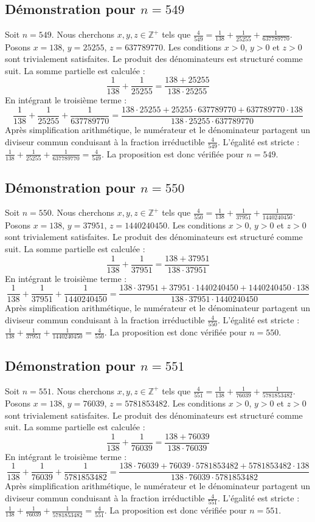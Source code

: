 \documentclass[11pt,a4paper]{article}
\begin{document}
\subsection{Démonstration pour $n = 549$}
Soit $n = 549$. Nous cherchons $x, y, z \in \mathbb{Z}^{+}$ tels que $\frac{4}{549} = \frac{1}{138} + \frac{1}{25255} + \frac{1}{637789770}$.
Posons $x = 138$, $y = 25255$, $z = 637789770$.
Les conditions $x > 0$, $y > 0$ et $z > 0$ sont trivialement satisfaites.
Le produit des dénominateurs est structuré comme suit. La somme partielle est calculée :
$$ \frac{1}{138} + \frac{1}{25255} = \frac{138+25255}{138 \cdot 25255} $$
En intégrant le troisième terme :
$$ \frac{1}{138} + \frac{1}{25255} + \frac{1}{637789770} = \frac{138 \cdot 25255 + 25255 \cdot 637789770 + 637789770 \cdot 138}{138 \cdot 25255 \cdot 637789770} $$
Après simplification arithmétique, le numérateur et le dénominateur partagent un diviseur commun conduisant à la fraction irréductible $\frac{4}{549}$.
L'égalité est stricte : $\frac{1}{138} + \frac{1}{25255} + \frac{1}{637789770} = \frac{4}{549}$.
La proposition est donc vérifiée pour $n = 549$.
\subsection{Démonstration pour $n = 550$}
Soit $n = 550$. Nous cherchons $x, y, z \in \mathbb{Z}^{+}$ tels que $\frac{4}{550} = \frac{1}{138} + \frac{1}{37951} + \frac{1}{1440240450}$.
Posons $x = 138$, $y = 37951$, $z = 1440240450$.
Les conditions $x > 0$, $y > 0$ et $z > 0$ sont trivialement satisfaites.
Le produit des dénominateurs est structuré comme suit. La somme partielle est calculée :
$$ \frac{1}{138} + \frac{1}{37951} = \frac{138+37951}{138 \cdot 37951} $$
En intégrant le troisième terme :
$$ \frac{1}{138} + \frac{1}{37951} + \frac{1}{1440240450} = \frac{138 \cdot 37951 + 37951 \cdot 1440240450 + 1440240450 \cdot 138}{138 \cdot 37951 \cdot 1440240450} $$
Après simplification arithmétique, le numérateur et le dénominateur partagent un diviseur commun conduisant à la fraction irréductible $\frac{4}{550}$.
L'égalité est stricte : $\frac{1}{138} + \frac{1}{37951} + \frac{1}{1440240450} = \frac{4}{550}$.
La proposition est donc vérifiée pour $n = 550$.
\subsection{Démonstration pour $n = 551$}
Soit $n = 551$. Nous cherchons $x, y, z \in \mathbb{Z}^{+}$ tels que $\frac{4}{551} = \frac{1}{138} + \frac{1}{76039} + \frac{1}{5781853482}$.
Posons $x = 138$, $y = 76039$, $z = 5781853482$.
Les conditions $x > 0$, $y > 0$ et $z > 0$ sont trivialement satisfaites.
Le produit des dénominateurs est structuré comme suit. La somme partielle est calculée :
$$ \frac{1}{138} + \frac{1}{76039} = \frac{138+76039}{138 \cdot 76039} $$
En intégrant le troisième terme :
$$ \frac{1}{138} + \frac{1}{76039} + \frac{1}{5781853482} = \frac{138 \cdot 76039 + 76039 \cdot 5781853482 + 5781853482 \cdot 138}{138 \cdot 76039 \cdot 5781853482} $$
Après simplification arithmétique, le numérateur et le dénominateur partagent un diviseur commun conduisant à la fraction irréductible $\frac{4}{551}$.
L'égalité est stricte : $\frac{1}{138} + \frac{1}{76039} + \frac{1}{5781853482} = \frac{4}{551}$.
La proposition est donc vérifiée pour $n = 551$.
\end{document}
